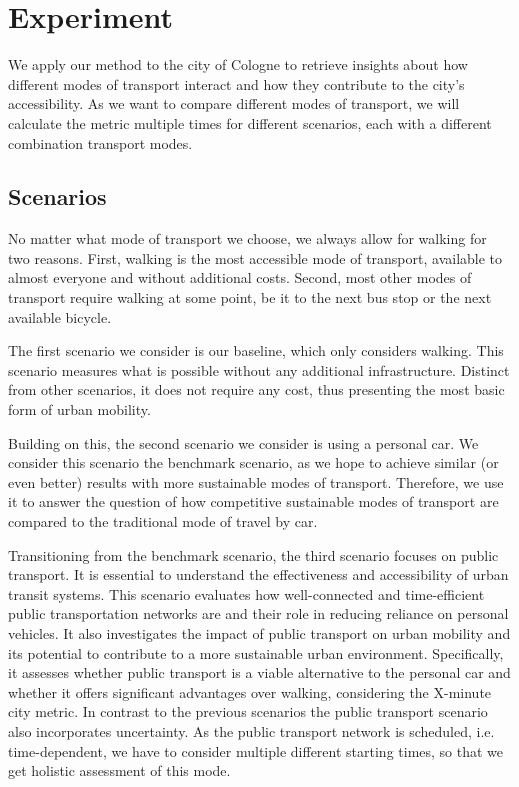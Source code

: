 \clearpage
\section{Experiment}
\label{sec:experiment}

We apply our method to the city of Cologne to retrieve insights about how different modes of transport interact and how they contribute to the city's accessibility.
As we want to compare different modes of transport, we will calculate the metric multiple times for different scenarios, each with a different combination transport modes.

\subsection{Scenarios}
\label{subs:scenarios}

No matter what mode of transport we choose, we always allow for walking for two reasons.
First, walking is the most accessible mode of transport, available to almost everyone and without additional costs.
Second, most other modes of transport require walking at some point, be it to the next bus stop or the next available bicycle.

The first scenario we consider is our baseline, which only considers walking.
This scenario measures what is possible without any additional infrastructure. 
Distinct from other scenarios, it does not require any cost, thus presenting the most basic form of urban mobility.

Building on this, the second scenario we consider is using a personal car.
We consider this scenario the benchmark scenario, as we hope to achieve similar (or even better) results with more sustainable modes of transport.
Therefore, we use it to answer the question of how competitive sustainable modes of transport are compared to the traditional mode of travel by car. 

Transitioning from the benchmark scenario, the third scenario focuses on public transport. 
It is essential to understand the effectiveness and accessibility of urban transit systems. 
This scenario evaluates how well-connected and time-efficient public transportation networks are and their role in reducing reliance on personal vehicles. 
It also investigates the impact of public transport on urban mobility and its potential to contribute to a more sustainable urban environment. 
Specifically, it assesses whether public transport is a viable alternative to the personal car and whether it offers significant advantages over walking, considering the X-minute city metric.
In contrast to the previous scenarios the public transport scenario also incorporates uncertainty.
As the public transport network is scheduled, i.e. time-dependent, we have to consider multiple different starting times, so that we get holistic assessment of this mode.

